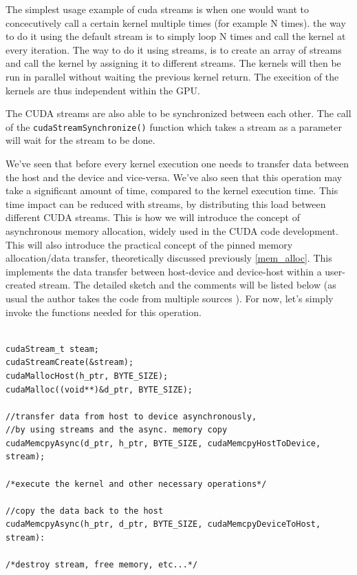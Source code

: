 \documentclass[12pt]{article}
\begin{document}
The simplest usage example of cuda streams is when one would want to concecutively call a certain kernel multiple times 
(for example N times). 
the way to do it using the default stream is to simply loop N times and call the kernel at every iteration.
The way to do it using streams, is to create an array of streams and call the kernel by assigning it to different streams.
The kernels will then be run in parallel without waiting the previous kernel return. The execition of the kernels 
are thus independent within the GPU. 

The CUDA streams are also able to be synchronized between each other. 
The call of the \verb|cudaStreamSynchronize()| function which takes a stream as a parameter will wait for the stream to be done.

We've seen that before every kernel execution one needs to transfer data between the host and the device and vice-versa. 
We've also seen that this operation may take a significant amount of time, compared to the kernel execution time. 
This time impact can be reduced with streams, by distributing this load between different CUDA streams. 
This is how we will introduce the concept of asynchronous memory allocation, widely used in the CUDA code development.
This will also introduce the practical concept of the pinned memory allocation/data transfer, 
theoretically discussed previously \ref{mem_alloc}. This implements the data transfer between host-device and device-host
within a user-created stream.
The detailed sketch and the comments will be listed below (as usual the author takes the code
from multiple sources \cite{center}). For now, let's simply invoke the 
functions needed for this operation. 

\begin{listing}[ht!]
\begin{verbatim}

cudaStream_t steam;
cudaStreamCreate(&stream);
cudaMallocHost(h_ptr, BYTE_SIZE);
cudaMalloc((void**)&d_ptr, BYTE_SIZE);

//transfer data from host to device asynchronously,
//by using streams and the async. memory copy
cudaMemcpyAsync(d_ptr, h_ptr, BYTE_SIZE, cudaMemcpyHostToDevice, stream);

/*execute the kernel and other necessary operations*/

//copy the data back to the host
cudaMemcpyAsync(h_ptr, d_ptr, BYTE_SIZE, cudaMemcpyDeviceToHost, stream):

/*destroy stream, free memory, etc...*/

\end{verbatim}
\end{listing}
\end{document}
